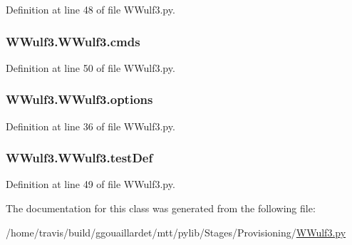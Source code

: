 Definition at line 48 of file W\-Wulf3.\-py.

\hypertarget{classWWulf3_1_1WWulf3_afb4fb9db2456e29872155d9b8738418f}{
\subsubsection[{cmds}]{\setlength{\rightskip}{0pt plus 5cm}W\-Wulf3.\-W\-Wulf3.\-cmds}}\label{classWWulf3_1_1WWulf3_afb4fb9db2456e29872155d9b8738418f}


Definition at line 50 of file W\-Wulf3.\-py.

\hypertarget{classWWulf3_1_1WWulf3_adff5ffd43f8b68d49c7b45ab48d7b428}{
\subsubsection[{options}]{\setlength{\rightskip}{0pt plus 5cm}W\-Wulf3.\-W\-Wulf3.\-options}}\label{classWWulf3_1_1WWulf3_adff5ffd43f8b68d49c7b45ab48d7b428}


Definition at line 36 of file W\-Wulf3.\-py.

\hypertarget{classWWulf3_1_1WWulf3_a9e8732432df9211bd64454c4c0e04098}{
\subsubsection[{test\-Def}]{\setlength{\rightskip}{0pt plus 5cm}W\-Wulf3.\-W\-Wulf3.\-test\-Def}}\label{classWWulf3_1_1WWulf3_a9e8732432df9211bd64454c4c0e04098}


Definition at line 49 of file W\-Wulf3.\-py.



The documentation for this class was generated from the following file\-:\begin{DoxyCompactItemize}
\item 
/home/travis/build/ggouaillardet/mtt/pylib/\-Stages/\-Provisioning/\hyperlink{WWulf3_8py}{W\-Wulf3.\-py}\end{DoxyCompactItemize}
